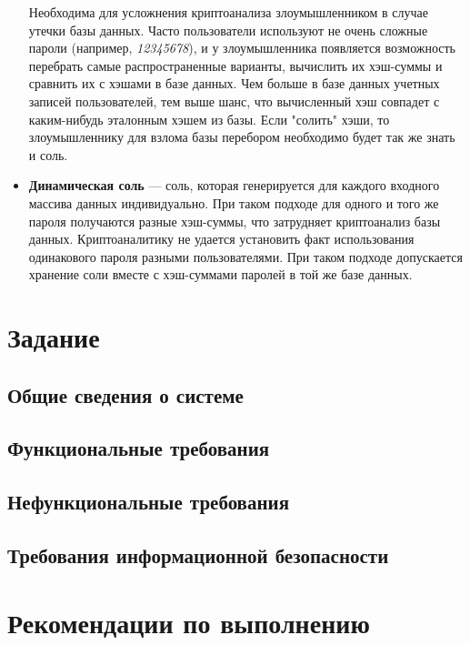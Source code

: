 \documentclass[14pt]{extarticle}
\begin{document}
\begin{itemize}
  
  Необходима для усложнения криптоанализа злоумышленником в случае утечки
  базы данных.
  Часто пользователи используют не очень сложные пароли (например,
  \textit{12345678}), и у злоумышленника появляется возможность перебрать
  самые распространенные варианты, вычислить их хэш-суммы и сравнить их с хэшами
  в базе данных\footnotemark{}.
  Чем больше в базе данных учетных записей пользователей, тем выше шанс, что
  вычисленный хэш совпадет с каким-нибудь эталонным хэшем из базы.
  Если "солить" хэши, то злоумышленнику для взлома базы перебором необходимо
  будет так же знать и соль.


 \item \textbf{Динамическая соль} --- соль, которая генерируется для каждого
  входного массива данных индивидуально.
  При таком подходе для одного и того же пароля получаются разные хэш-суммы,
  что затрудняет криптоанализ базы данных.
  Криптоаналитику не удается установить факт использования одинакового пароля
  разными пользователями.
  При таком подходе допускается хранение соли вместе с хэш-суммами паролей
  в той же базе данных.

\end{itemize}

\section{Задание}

\subsection{Общие сведения о системе}

\subsection{Функциональные требования}

\subsection{Нефункциональные требования}

\subsection{Требования информационной безопасности}

\section{Рекомендации по выполнению}
\end{document}
